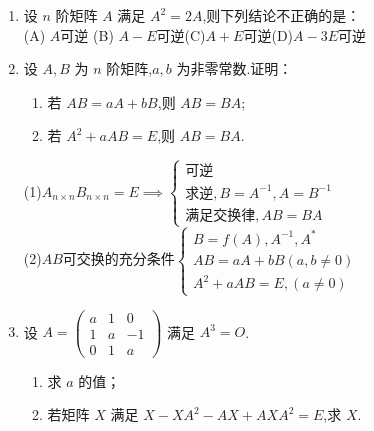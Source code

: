 \documentclass[12pt, a4paper, oneside, UTF8]{ctexbook}
\begin{document}
\begin{enumerate}[label=\arabic*.,start=4]
    \item 设 $ n $ 阶矩阵 $ A $ 满足 $ A^2 = 2A $,则下列结论不正确的是： \\
    (A) $A$可逆 \qquad (B) $A-E$可逆\qquad (C)$A+E$可逆\qquad (D)$A-3E$可逆 
    \begin{solution}
    \newpage
    \end{solution}
    
    \item 设 $ A, B $ 为 $ n $ 阶矩阵,$ a, b $ 为非零常数.证明：
    \begin{enumerate}
        \item 若 $ AB = aA + bB $,则 $ AB = BA $;
        \item 若 $ A^2 + aAB = E $,则 $ AB = BA $.
    \end{enumerate}
    
    \begin{solution}
    \newpage
    \end{solution}
    
    \begin{tcolorbox}[title=总结]
    (1)$A_{n\times n}B_{n\times n}=E\implies\begin{cases}
        \text{可逆}\\
        \text{求逆}, B=A^{-1}, A=B^{-1} \\
        \text{满足交换律},AB=BA
    \end{cases}$ \\
    (2)$AB$可交换的充分条件$\begin{cases}
        B=f(A),A^{-1},A^* \\
        AB=aA+bB(a,b\neq 0) \\
        A^2+aAB=E,(a\neq 0)
    \end{cases}$
    \end{tcolorbox}
    \item 设 
    $A = \begin{pmatrix}
    a & 1 & 0 \\
    1 & a & -1 \\
    0 & 1 & a
    \end{pmatrix}$
    满足 $ A^3 = O $.
    \begin{enumerate}
        \item 求 $ a $ 的值；
        \item 若矩阵 $ X $ 满足 $ X - XA^2 - AX + AXA^2 = E $,求 $ X $.
    \end{enumerate}
    
    \begin{solution}
    \newpage
    \end{solution}
\end{enumerate}
\end{document}
